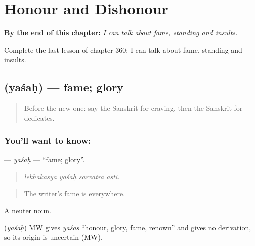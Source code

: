 
\chapter{Honour and Dishonour}
\label{ch:sa-honour-and-dishonour}

\begin{chapteropening}
\textbf{By the end of this chapter:} \emph{I can talk about fame, standing and insults.}

Complete the last lesson of chapter 360: I can talk about fame, standing and insults.
\end{chapteropening}

\section[\texorpdfstring{\sk{यशः} (yaśaḥ)}{यशः (yaśaḥ)}]{ (yaśaḥ) — fame; glory}

\label{lesson:SA-C360-yasah}



\begin{quote}
Before the new one: say the Sanskrit for craving, then the Sanskrit for dedicates.
\end{quote}

\subsection*{You'll want to know: }
\textbf{} — \emph{yaśaḥ} — \textquotedblleft{}fame; glory\textquotedblright{}.

\begin{quote}
   
\end{quote}

\begin{quote}
\emph{lekhakasya yaśaḥ sarvatra asti.}
\end{quote}

\begin{quote}
The writer's fame is everywhere.
\end{quote}

A neuter noun.

\begin{cousinweb}
\textbf{} (\emph{yaśaḥ}) MW gives \emph{yaśas} \textquotedblleft{}honour, glory, fame, renown\textquotedblright{} and gives no derivation, so its origin is uncertain (MW).
\end{cousinweb}

